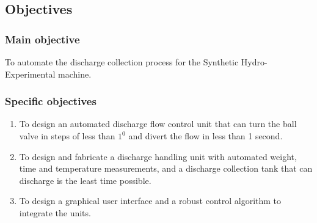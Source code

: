 \subsection{Objectives}
\subsubsection{Main objective}

 To automate the discharge collection process for the Synthetic Hydro-Experimental machine. 

\subsubsection{Specific objectives}

\begin{enumerate}
	\item To design an automated discharge flow control unit that can turn the ball valve in steps of less than $1^{0}$ and divert the flow in less than 1 second.
	\item To design and fabricate a discharge handling unit with automated weight, time and temperature measurements, and a discharge collection tank that can discharge is the least time possible.
    \item To design a graphical user interface and a robust control algorithm to integrate the units.

\end{enumerate}

